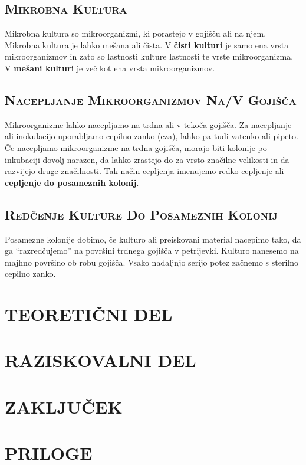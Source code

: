 \documentclass[12pt, a4paper]{report}
\begin{document}
\section{\textsc{Mikrobna Kultura}}

Mikrobna kultura so mikroorganizmi, ki porastejo v gojišču ali na njem. Mikrobna kultura je lahko mešana ali čista. V \textbf{čisti kulturi} je samo ena vrsta mikroorganizmov in zato so lastnosti kulture lastnosti te vrste mikroorganizma. V \textbf{mešani kulturi} je več kot ena vrsta mikroorganizmov.

\section{\textsc{Nacepljanje Mikroorganizmov Na/V Gojišča}}

Mikroorganizme lahko nacepljamo na trdna ali v tekoča gojišča. Za nacepljanje ali inokulacijo uporabljamo cepilno zanko (eza), lahko pa tudi vatenko ali pipeto. Če nacepljamo mikroorganizme na trdna gojišča, morajo biti kolonije po inkubaciji dovolj narazen, da lahko zrastejo do za vrsto značilne velikosti in da razvijejo druge značilnosti. Tak način cepljenja imenujemo redko cepljenje ali \textbf{cepljenje do posameznih kolonij}.

\section{\textsc{Redčenje Kulture Do Posameznih Kolonij}}

Posamezne kolonije dobimo, če kulturo ali preiskovani material nacepimo tako, da ga ``razredčujemo'' na površini trdnega gojišča v petrijevki. Kulturo nanesemo na majhno površino ob robu gojišča. Vsako nadaljnjo serijo potez začnemo s sterilno cepilno zanko.

\chapter{TEORETIČNI DEL}

\chapter{RAZISKOVALNI DEL}

\chapter{ZAKLJUČEK}

\chapter{PRILOGE}
\end{document}
